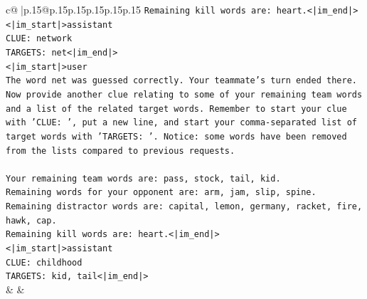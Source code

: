 \documentclass{article}
\begin{document}
{\begin{supertabular}{c@{$\;$}|p{.15\linewidth}@{}p{.15\linewidth}p{.15\linewidth}p{.15\linewidth}p{.15\linewidth}p{.15\linewidth}}
{{{\texttt{Remaining kill words are: heart.<|im\_end|>} \\
\texttt{<|im\_start|>assistant} \\
\texttt{CLUE: network} \\
\texttt{TARGETS: net<|im\_end|>} \\
\texttt{<|im\_start|>user} \\
\texttt{The word net was guessed correctly. Your teammate's turn ended there.} \\
\texttt{Now provide another clue relating to some of your remaining team words and a list of the related target words. Remember to start your clue with 'CLUE: ', put a new line, and start your comma{-}separated list of target words with 'TARGETS: '. Notice: some words have been removed from the lists compared to previous requests.} \\
\\ 
\texttt{Your remaining team words are: pass, stock, tail, kid.} \\
\texttt{Remaining words for your opponent are: arm, jam, slip, spine.} \\
\texttt{Remaining distractor words are: capital, lemon, germany, racket, fire, hawk, cap.} \\
\texttt{Remaining kill words are: heart.<|im\_end|>} \\
\texttt{<|im\_start|>assistant} \\
\texttt{CLUE: childhood} \\
\texttt{TARGETS: kid, tail<|im\_end|>} \\
            }
        }
    }
    & & \\ \\


\end{supertabular}}
\end{document}
